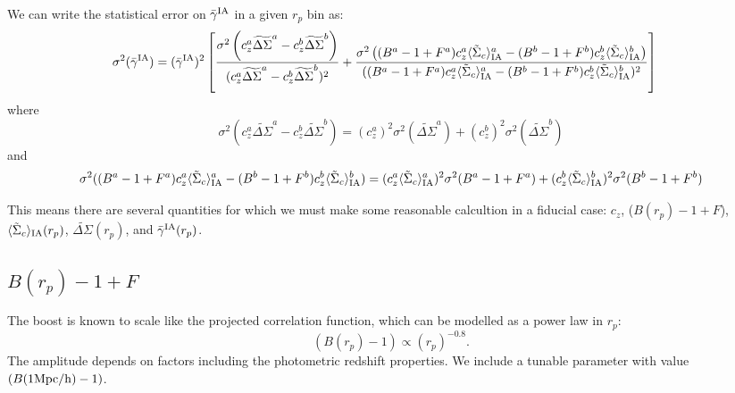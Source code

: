 \documentclass[onecolumn,amsmath,aps,fleqn, superscriptaddress]{revtex4}
\begin{document}
We can write the statistical error on $\bar{\gamma}^{\rm IA}$ in a given $r_p$ bin as:
\begin{align}
\sigma^2(\bar{\gamma}^{\rm IA}) &= (\bar{\gamma}^{\rm IA})^2 \left[\frac{\sigma^2\left(c_z^a \widetilde{\Delta\Sigma}^a - c_z^b \widetilde{\Delta\Sigma}^b\right)}{(c_z^a \widetilde{\Delta\Sigma}^a - c_z^b \widetilde{\Delta\Sigma}^b)^2} + \frac{\sigma^2\left((B^a-1+F^a)c_z^a \langle \tilde{\Sigma}_c\rangle_{\rm IA}^a - (B^b-1+F^b)c_z^b \langle \tilde{\Sigma}_c\rangle_{\rm IA}^b\right)}{((B^a-1+F^a)c_z^a \langle \tilde{\Sigma}_c\rangle_{\rm IA}^a - (B^b-1+F^b)c_z^b \langle \tilde{\Sigma}_c\rangle_{\rm IA}^b)^2} \right] 
\label{siggam}
\end{align}
where
\begin{equation}
\sigma^2(c_z^a \widetilde{\Delta\Sigma}^a  - c_z^b \widetilde{\Delta\Sigma}^b) = (c_z^a)^2  \sigma^2 (\widetilde{\Delta\Sigma}^a) + (c_z^b)^2\sigma^2(\widetilde{\Delta\Sigma}^b)
\label{sigtop}
\end{equation}
and 
\begin{equation}
\sigma^2((B^a-1+F^a)c_z^a \langle \tilde{\Sigma}_c\rangle_{\rm IA}^a - (B^b-1+F^b)c_z^b \langle \tilde{\Sigma}_c\rangle_{\rm IA}^b) = (c_z^a \langle \tilde{\Sigma}_c\rangle_{\rm IA}^a)^2 \sigma^2(B^a-1+F^a) + (c_z^b \langle \tilde{\Sigma}_c\rangle_{\rm IA}^b)^2 \sigma^2(B^b-1+F^b)
\label{sigbottom}
\end{equation}

This means there are several quantities for which we must make some reasonable calcultion in a fiducial case: $c_z$, ($B(r_p)-1+F$), $\langle \tilde{\Sigma}_c\rangle_{\rm IA}(r_p)$, $\widetilde{\Delta\Sigma}(r_p)$, and $\bar{\gamma}^{\rm IA}(r_p)$.

\subsection*{$B(r_p)-1+F$}

The boost is known to scale like the projected correlation function, which can be modelled as a power law in $r_p$: 
\begin{equation}
(B(r_p)-1) \propto (r_p)^{-0.8}.
\label{boost}
\end{equation}
The amplitude depends on factors including the photometric redshift properties. We include a tunable parameter with value $(B(1 {\rm Mpc/h})-1)$.
\end{document}
